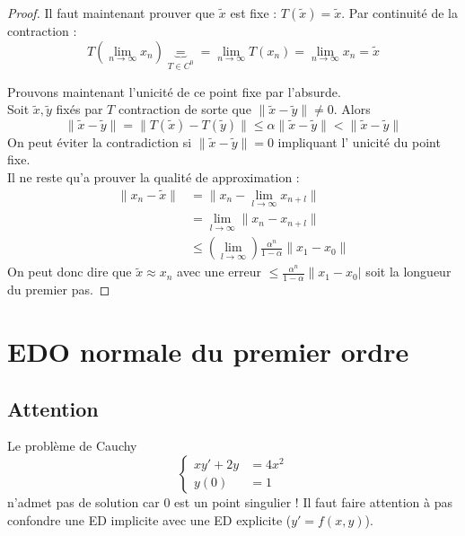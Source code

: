 \begin{proof}
	Il faut maintenant prouver que $\tilde{x}$ est fixe : $T(\tilde{x}) = \tilde{x}$. 
	Par continuité de la contraction :
	\begin{equation}
	T(\lim\limits_{n\rightarrow\infty} x_n) \underbrace{=}_{T \in C^0} = \lim\limits_{n
	\rightarrow\infty} T(x_n) = \lim\limits_{n\rightarrow\infty} x_n = \tilde{x}
	\end{equation}
	
	
	Prouvons maintenant l'unicité de ce point fixe par l'absurde.\\
	Soit $\tilde{x}, \tilde{y}$ fixés par $T$ contraction de sorte que $\|\tilde{x}
	-\tilde{y}\| \neq 0$. Alors 
	\begin{equation}
	\|\tilde{x}-\tilde{y}\| = \| T(\tilde{x}) - T(\tilde{y})\| \leq\alpha\|\tilde{x}-
	\tilde{y}\| < \|\tilde{x}-\tilde{y}\|
	\end{equation}
	On peut éviter la contradiction si $\|\tilde{x}-\tilde{y}\| = 0$ impliquant l'
	unicité du point fixe.\\
		
	Il ne reste qu'a prouver la qualité de approximation :
	\begin{equation}
	\begin{array}{ll}
	\| x_n-\tilde{x}\| &= \|x_n - \lim\limits_{l\rightarrow\infty} x_{n+l}\|\\
	 & = \lim\limits_{l\rightarrow\infty} \|x_n-x_{n+l}\|\\
	 & \leq \left(\lim\limits_{l\rightarrow\infty}\right) \frac{\alpha^n}{1-\alpha} 
	 \|x_1-x_0\|
	\end{array}
	\end{equation}
	On peut donc dire que $\tilde{x} \approx x_n$ avec une erreur $\leq \frac{\alpha^n}{
	1-\alpha}\|x_1-x_0|$ soit la longueur du premier pas.
	\end{proof}
	



\setcounter{section}{0}
\section{EDO normale du premier ordre}
	\subsection{Attention }
	Le problème de Cauchy 
	\begin{equation}
	\left\{\begin{array}{ll}
	xy' + 2y &= 4x^2	\\
	y(0) &= 1
	\end{array}\right.
	\end{equation}
	n'admet pas de solution car 0 est un point singulier ! Il faut faire attention à 
	pas confondre une ED implicite avec une ED explicite ($y' = f(x,y)$).
	
